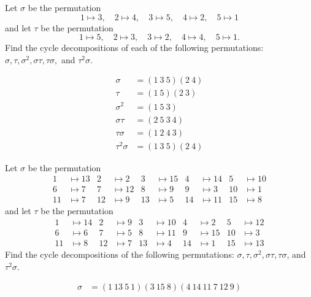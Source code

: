 \begin{problems}
    \item \label{ex1.3.1} Let $\sigma$ be the permutation
    $$1 \mapsto 3, \quad 2 \mapsto 4, \quad 3 \mapsto 5, \quad 4 \mapsto 2, \quad 5 \mapsto 1$$
    and let $\tau$ be the permutation
    $$1 \mapsto 5, \quad 2 \mapsto 3, \quad 3 \mapsto 2, \quad 4 \mapsto 4, \quad 5 \mapsto 1.$$
    Find the cycle decompositions of each of the following permutations:
    $\sigma, \tau, \sigma^2, \sigma\tau, \tau\sigma,$ and $\tau^2\sigma.$
    \begin{sol}
        \begin{align*}
            \sigma & = (1\ 3\ 5)(2\ 4) \\
            \tau & = (1\ 5)(2\ 3) \\
            \sigma^2 & = (1\ 5\ 3) \\
            \sigma\tau & = (2\ 5\ 3\ 4)\\
            \tau\sigma & = (1\ 2\ 4\ 3)\\
            \tau^2\sigma & = (1\ 3\ 5)(2\ 4)
        \end{align*}
    \end{sol}
    \item \label{ex1.3.2} Let $\sigma$ be the permutation
    \begin{align*}
        1 &\mapsto 13 & 2 &\mapsto 2 & 3 & \mapsto 15 & 4 & \mapsto 14 & 5 & \mapsto 10  \\
        6 &\mapsto 7 & 7 &\mapsto 12 & 8 & \mapsto 9 & 9 & \mapsto 3 & 10 & \mapsto 1 \\
        11 &\mapsto 7 & 12 &\mapsto 9 & 13 & \mapsto 5 & 14 & \mapsto 11 & 15 & \mapsto 8
    \end{align*}
    and let $\tau$ be the permutation
    \begin{align*}
        1 &\mapsto 14 & 2 &\mapsto 9 & 3 &\mapsto 10 & 4 &\mapsto 2 & 5 &\mapsto 12 \\
        6 &\mapsto 6 & 7 &\mapsto 5 & 8 &\mapsto 11 & 9 &\mapsto 15 & 10 &\mapsto 3 \\
        11 &\mapsto 8 & 12 &\mapsto 7 & 13 &\mapsto 4 & 14 &\mapsto 1 & 15 &\mapsto 13
    \end{align*}
    Find the cycle decompositions of the following permutations: $\sigma, \tau, \sigma^2, \sigma\tau, \tau\sigma$, and $\tau^2\sigma.$
    \begin{sol}
        \begin{align*}
            \sigma & = (1\ 13\ 5\ 1)(3\ 15\ 8)(4\ 14\ 11\ 7\ 12\ 9)\\

\end{align*}
\end{sol}
\end{problems}
